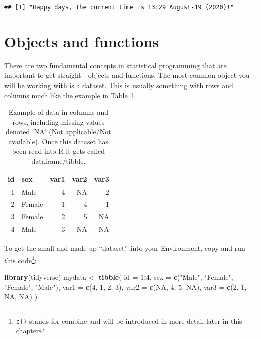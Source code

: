 \documentclass[
  12pt,
  krantz2]{krantz}
\makeatletter
\newenvironment{Shaded}{\begin{snugshade}}{\end{snugshade}}
\newcommand{\DataTypeTok}[1]{\textcolor[rgb]{0.13,0.29,0.53}{#1}}
\newcommand{\DecValTok}[1]{\textcolor[rgb]{0.00,0.00,0.81}{#1}}
\newcommand{\KeywordTok}[1]{\textcolor[rgb]{0.13,0.29,0.53}{\textbf{#1}}}
\newcommand{\NormalTok}[1]{#1}
\newcommand{\OperatorTok}[1]{\textcolor[rgb]{0.81,0.36,0.00}{\textbf{#1}}}
\newcommand{\OtherTok}[1]{\textcolor[rgb]{0.56,0.35,0.01}{#1}}
\newcommand{\StringTok}[1]{\textcolor[rgb]{0.31,0.60,0.02}{#1}}
\newenvironment{kframe}{%
\medskip{}
\setlength{\fboxsep}{.8em}
 \def\at@end@of@kframe{}%
 \ifinner\ifhmode%
  \def\at@end@of@kframe{\end{minipage}}%
  \begin{minipage}{\columnwidth}%
 \fi\fi%
 \def\FrameCommand##1{\hskip\@totalleftmargin \hskip-\fboxsep
 \colorbox{shadecolor}{##1}\hskip-\fboxsep
     \hskip-\linewidth \hskip-\@totalleftmargin \hskip\columnwidth}%
 \MakeFramed {\advance\hsize-\width
   \@totalleftmargin\z@ \linewidth\hsize
   \@setminipage}}%
 {\par\unskip\endMakeFramed%
 \at@end@of@kframe}
\renewenvironment{Shaded}{\begin{kframe}}{\end{kframe}}
\makeatother
\begin{document}
\begin{verbatim}
## [1] "Happy days, the current time is 13:29 August-19 (2020)!"
\end{verbatim}

\hypertarget{chap02-objects-functions}{%
\section{Objects and functions}\label{chap02-objects-functions}}


There are two fundamental concepts in statistical programming that are important to get straight - objects and functions.
The most common object you will be working with is a dataset.
This is usually something with rows and columns much like the example in Table \ref{tab:chap2-tab-examp1}.

\begin{table}

\caption{\label{tab:chap2-tab-examp1}Example of data in columns and rows, including missing values denoted `NA` (Not applicable/Not available). Once this dataset has been read into R it gets called dataframe/tibble.}
\centering
\fontsize{9}{11}\selectfont
\begin{tabular}[t]{rlrrr}
\toprule
id & sex & var1 & var2 & var3\\
\midrule
1 & Male & 4 & NA & 2\\
2 & Female & 1 & 4 & 1\\
3 & Female & 2 & 5 & NA\\
4 & Male & 3 & NA & NA\\
\bottomrule
\end{tabular}
\end{table}

\FloatBarrier

To get the small and made-up ``dataset'' into your Environment, copy and run this code\footnote{\texttt{c()} stands for combine and will be introduced in more detail later in this chapter}:

\begin{Shaded}
\begin{Highlighting}[]
\KeywordTok{library}\NormalTok{(tidyverse)}
\NormalTok{mydata <-}\StringTok{ }\KeywordTok{tibble}\NormalTok{(}
  \DataTypeTok{id   =} \DecValTok{1}\OperatorTok{:}\DecValTok{4}\NormalTok{,}
  \DataTypeTok{sex  =} \KeywordTok{c}\NormalTok{(}\StringTok{"Male"}\NormalTok{, }\StringTok{"Female"}\NormalTok{, }\StringTok{"Female"}\NormalTok{, }\StringTok{"Male"}\NormalTok{),}
  \DataTypeTok{var1 =} \KeywordTok{c}\NormalTok{(}\DecValTok{4}\NormalTok{, }\DecValTok{1}\NormalTok{, }\DecValTok{2}\NormalTok{, }\DecValTok{3}\NormalTok{),}
  \DataTypeTok{var2 =} \KeywordTok{c}\NormalTok{(}\OtherTok{NA}\NormalTok{, }\DecValTok{4}\NormalTok{, }\DecValTok{5}\NormalTok{, }\OtherTok{NA}\NormalTok{),}
  \DataTypeTok{var3 =} \KeywordTok{c}\NormalTok{(}\DecValTok{2}\NormalTok{, }\DecValTok{1}\NormalTok{, }\OtherTok{NA}\NormalTok{, }\OtherTok{NA}\NormalTok{)}
\NormalTok{)}
\end{Highlighting}
\end{Shaded}
\end{document}
